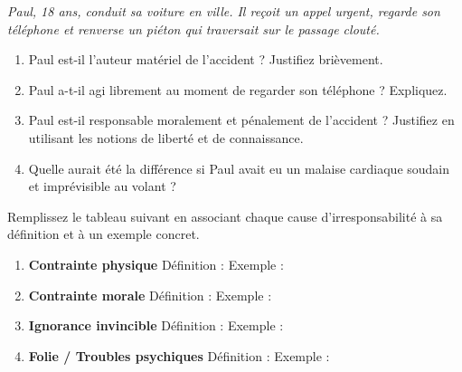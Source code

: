 \documentclass[11pt]{article}
\begin{document}
\begin{exercice}
\textit{Paul, 18 ans, conduit sa voiture en ville. Il reçoit un appel urgent, regarde son téléphone et renverse un piéton qui traversait sur le passage clouté.}
\begin{enumerate}
    \item Paul est-il l'auteur matériel de l'accident ? Justifiez brièvement.
    \item Paul a-t-il agi librement au moment de regarder son téléphone ? Expliquez.
    \item Paul est-il responsable moralement et pénalement de l'accident ? Justifiez en utilisant les notions de liberté et de connaissance.
    \item Quelle aurait été la différence si Paul avait eu un malaise cardiaque soudain et imprévisible au volant ?
\end{enumerate}
\end{exercice}

\begin{exercice}
Remplissez le tableau suivant en associant chaque cause d'irresponsabilité à sa définition et à un exemple concret.
\begin{enumerate}
    \item \textbf{Contrainte physique} \quad Définition : \underline{\hspace{6cm}} \quad Exemple : \underline{\hspace{6cm}}
    \item \textbf{Contrainte morale} \quad Définition : \underline{\hspace{6cm}} \quad Exemple : \underline{\hspace{6cm}}
    \item \textbf{Ignorance invincible} \quad Définition : \underline{\hspace{6cm}} \quad Exemple : \underline{\hspace{6cm}}
    \item \textbf{Folie / Troubles psychiques} \quad Définition : \underline{\hspace{6cm}} \quad Exemple : \underline{\hspace{6cm}}
\end{enumerate}
\end{exercice}
\end{document}

